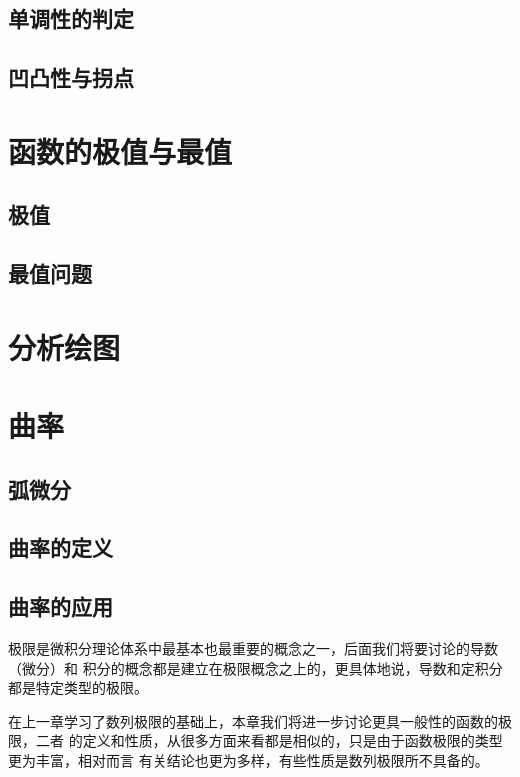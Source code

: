 \subsection{单调性的判定}

\subsection{凹凸性与拐点}

\section{函数的极值与最值}

\subsection{极值}

\subsection{最值问题}

\section{分析绘图}

\section{曲率}

\subsection{弧微分}

\subsection{曲率的定义}

\subsection{曲率的应用}

极限是微积分理论体系中最基本也最重要的概念之一，后面我们将要讨论的导数（微分）和
积分的概念都是建立在极限概念之上的，更具体地说，导数和定积分都是特定类型的极限。

在上一章学习了数列极限的基础上，本章我们将进一步讨论更具一般性的函数的极限，二者
的定义和性质，从很多方面来看都是相似的，只是由于函数极限的类型更为丰富，相对而言
有关结论也更为多样，有些性质是数列极限所不具备的。


